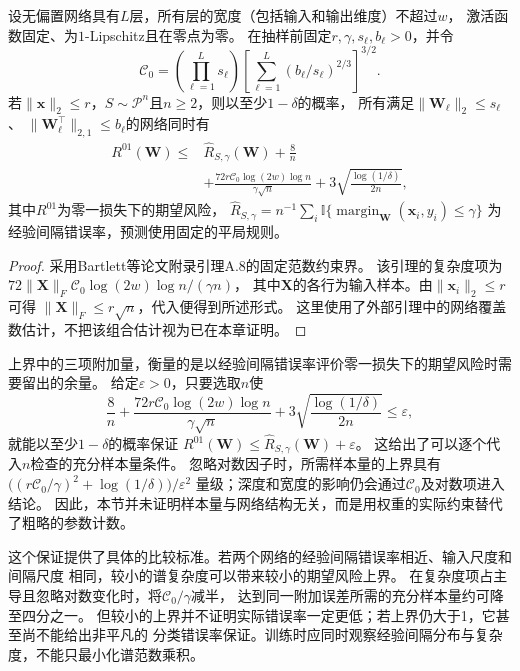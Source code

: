 \begin{theorem}[深层网络的谱复杂度与期望风险]
\label{thm:spectral-network-risk}
设无偏置网络具有$L$层，所有层的宽度（包括输入和输出维度）不超过$w$，
激活函数固定、为$1$-Lipschitz且在零点为零。
在抽样前固定$r,\gamma,s_\ell,b_\ell>0$，并令
\[
 \mathcal C_0=
 \left(\prod_{\ell=1}^L s_\ell\right)
 \left[\sum_{\ell=1}^L(b_\ell/s_\ell)^{2/3}\right]^{3/2}.
\]
若$\|\bm x\|_2\leq r$，$S\sim\mathcal P^n$且$n\geq2$，则以至少$1-\delta$的概率，
所有满足$\|\bm W_\ell\|_2\leq s_\ell$、
$\|\bm W_\ell^\top\|_{2,1}\leq b_\ell$的网络同时有
\begin{equation}
 \begin{aligned}
 R^{01}(\bm W)\leq{}&\hat R_{S,\gamma}(\bm W)+\frac8n\\
 &+\frac{72r\mathcal C_0\log(2w)\log n}{\gamma\sqrt n}
 +3\sqrt{\frac{\log(1/\delta)}{2n}},
 \end{aligned}
 \label{eq:spectral-risk-explicit}
\end{equation}
其中$R^{01}$为零一损失下的期望风险，
$\hat R_{S,\gamma}=n^{-1}\sum_i
\mathbb I\{\operatorname{margin}_{\bm W}(\bm x_i,y_i)\leq\gamma\}$
为经验间隔错误率，预测使用固定的平局规则。
\end{theorem}
\begin{proof}
采用Bartlett等论文附录引理A.8的固定范数约束界。
该引理的复杂度项为
$72\|\bm X\|_F\mathcal C_0\log(2w)\log n/(\gamma n)$，
其中$\bm X$的各行为输入样本。由$\|\bm x_i\|_2\leq r$可得
$\|\bm X\|_F\leq r\sqrt n$，代入便得到所述形式。
这里使用了外部引理中的网络覆盖数估计，不把该组合估计视为已在本章证明。
\end{proof}

上界中的三项附加量，衡量的是以经验间隔错误率评价零一损失下的期望风险时需要留出的余量。
给定$\varepsilon>0$，只要选取$n$使
\[
 \frac8n+\frac{72r\mathcal C_0\log(2w)\log n}{\gamma\sqrt n}
 +3\sqrt{\frac{\log(1/\delta)}{2n}}\leq\varepsilon,
\]
就能以至少$1-\delta$的概率保证
$R^{01}(\bm W)\leq\hat R_{S,\gamma}(\bm W)+\varepsilon$。
这给出了可以逐个代入$n$检查的充分样本量条件。
忽略对数因子时，所需样本量的上界具有
$\bigl((r\mathcal C_0/\gamma)^2+\log(1/\delta)\bigr)/\varepsilon^2$
量级；深度和宽度的影响仍会通过$\mathcal C_0$及对数项进入结论。
因此，本节并未证明样本量与网络结构无关，而是用权重的实际约束替代了粗略的参数计数。

这个保证提供了具体的比较标准。若两个网络的经验间隔错误率相近、输入尺度和间隔尺度
相同，较小的谱复杂度可以带来较小的期望风险上界。
在复杂度项占主导且忽略对数变化时，将$\mathcal C_0/\gamma$减半，
达到同一附加误差所需的充分样本量约可降至四分之一。
但较小的上界并不证明实际错误率一定更低；若上界仍大于1，它甚至尚不能给出非平凡的
分类错误率保证。训练时应同时观察经验间隔分布与复杂度，不能只最小化谱范数乘积。

